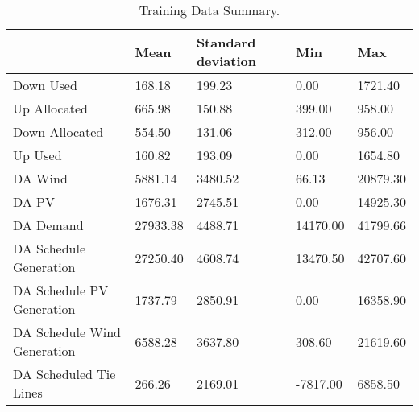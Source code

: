 \begin{table}[H] 
    \caption{Training Data Summary. \label{training_data_sum}}
    \begin{tabularx}{\textwidth}{CCCCC}
    \toprule
    & \textbf{Mean}	& \textbf{Standard deviation}	& \textbf{Min} & \textbf{Max}\\
    \midrule
    Down Used & 168.18 & 199.23 & 0.00 & 1721.40 \\
    Up Allocated & 665.98 & 150.88 & 399.00 & 958.00 \\
    Down Allocated & 554.50 & 131.06 & 312.00 & 956.00 \\
    Up Used & 160.82 & 193.09 & 0.00 & 1654.80 \\
    DA Wind & 5881.14 & 3480.52 & 66.13 & 20879.30 \\
    DA PV & 1676.31 & 2745.51 & 0.00 & 14925.30 \\
    DA Demand & 27933.38 & 4488.71 & 14170.00 & 41799.66 \\
    DA Schedule Generation & 27250.40 & 4608.74 & 13470.50 & 42707.60 \\
    DA Schedule PV Generation & 1737.79 & 2850.91 & 0.00 & 16358.90 \\
    DA Schedule Wind Generation & 6588.28 & 3637.80 & 308.60 & 21619.60 \\
    DA Scheduled Tie Lines & 266.26 & 2169.01 & -7817.00 & 6858.50 \\
    \bottomrule
    \end{tabularx}
\end{table}

